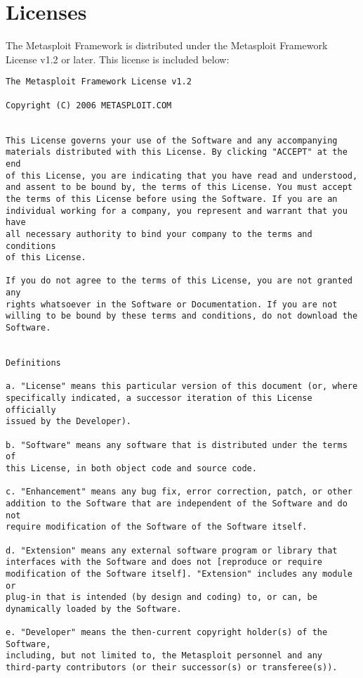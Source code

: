 \documentclass{report}
\begin{document}
\pagebreak
\chapter{Licenses}

\par
The Metasploit Framework is distributed under the Metasploit Framework License
v1.2 or later.  This license is included below:

{\footnotesize
\begin{verbatim}
The Metasploit Framework License v1.2

Copyright (C) 2006 METASPLOIT.COM


This License governs your use of the Software and any accompanying 
materials distributed with this License. By clicking "ACCEPT" at the end 
of this License, you are indicating that you have read and understood, 
and assent to be bound by, the terms of this License. You must accept 
the terms of this License before using the Software. If you are an 
individual working for a company, you represent and warrant that you have 
all necessary authority to bind your company to the terms and conditions 
of this License. 

If you do not agree to the terms of this License, you are not granted any 
rights whatsoever in the Software or Documentation. If you are not 
willing to be bound by these terms and conditions, do not download the 
Software.


Definitions

a. "License" means this particular version of this document (or, where 
specifically indicated, a successor iteration of this License officially 
issued by the Developer). 

b. "Software" means any software that is distributed under the terms of 
this License, in both object code and source code. 

c. "Enhancement" means any bug fix, error correction, patch, or other 
addition to the Software that are independent of the Software and do not 
require modification of the Software of the Software itself.

d. "Extension" means any external software program or library that 
interfaces with the Software and does not [reproduce or require 
modification of the Software itself]. "Extension" includes any module or 
plug-in that is intended (by design and coding) to, or can, be 
dynamically loaded by the Software. 

e. "Developer" means the then-current copyright holder(s) of the Software, 
including, but not limited to, the Metasploit personnel and any 
third-party contributors (or their successor(s) or transferee(s)). 


\end{verbatim}}
\end{document}
